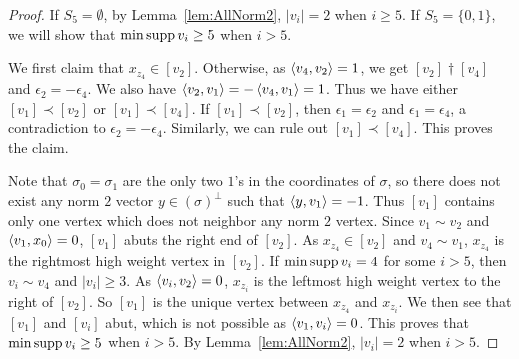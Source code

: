 \begin{proof}
If $S_5=\emptyset$, by  Lemma~\ref{lem:AllNorm2}, $|v_i|=2$ when $i \ge 5$. If $S_5=\{0,1\}$, we will show that $\min \operatorname{supp} v_i \ge5$ when $i>5$.

We first claim that $x_{z_4}\in[v_2]$. Otherwise, as $\left\langle v_4 , v_2 \right\rangle=1$, we get $[v_2]\dagger[v_4]$ and $\epsilon_2=-\epsilon_4$. We also have $\left\langle v_2 , v_1 \right\rangle=-\left\langle v_4 , v_1 \right\rangle=1$. Thus we have either $[v_1]\prec[v_2]$ or $[v_1]\prec[v_4]$. If $[v_1]\prec[v_2]$, then $\epsilon_1=\epsilon_2$ and $\epsilon_1=\epsilon_4$, a contradiction to $\epsilon_2=-\epsilon_4$. Similarly, we can rule out $[v_1]\prec[v_4]$. This proves the claim.

Note that $\sigma_0=\sigma_1$ are the only two $1$'s in the coordinates of $\sigma$, so there does not exist any norm $2$ vector $y\in (\sigma)^{\perp}$ such that $\left\langle y , v_1 \right\rangle=-1$. Thus $[v_1]$ contains only one vertex which does not neighbor any norm $2$ vertex. 
Since $v_1\sim v_2$ and $\left\langle v_1 , x_0 \right\rangle=0$, $[v_1]$ abuts the right end of $[v_2]$. 
As $x_{z_4}\in[v_2]$ and $v_4\sim v_1$, $x_{z_4}$ is the rightmost high weight vertex in $[v_2]$.
If $\min \operatorname{supp} v_i=4$ for some $i>5$, then $v_i\sim v_4$ and $|v_i|\ge3$. 
As $\left\langle v_i , v_2 \right\rangle=0$, $x_{z_i}$ is the leftmost high weight vertex to the right of $[v_2]$. So $[v_1]$ is the unique vertex between $x_{z_4}$ and $x_{z_i}$. We then see that $[v_1]$ and $[v_i]$ abut, which is not possible as $\left\langle v_1 , v_i \right\rangle=0$.
This proves that  $\min \operatorname{supp} v_i \ge5$ when $i>5$.
By  Lemma~\ref{lem:AllNorm2}, $|v_i|=2$ when $i > 5$.
\end{proof}


